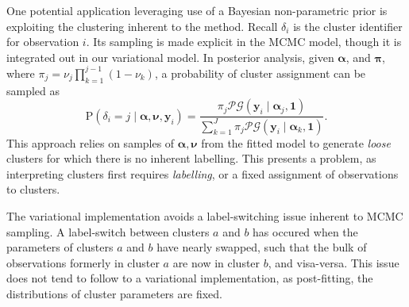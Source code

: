 \begin{comment}
    \begin{itemize}
        \item description of storm parameter clustering problem
        \item Introduction of variational inference
        \begin{itemize}
            \item describe variational distribution
            \item necessity (only model using t90 dataset)
            \item relative performance (computational speed)
        \end{itemize}
        \item describe clustering methodology
        \item Emergent clusters from both t90 and all--but--road--features in input space.
        \item what does this mean?
    \end{itemize}
\end{comment}

One potential application leveraging use of a Bayesian non-parametric prior is 
    exploiting the clustering inherent to the method. Recall $\delta_i$ is the 
    cluster identifier for observation $i$.  Its sampling is made explicit in
    the MCMC model, though it is integrated out in our variational model. In
    posterior analysis, given $\bm{\alpha}$, and $\bm{\pi}$, where 
    $\pi_j = \nu_j\prod_{k = 1}^{j-1}(1 - \nu_k)$, a probability of cluster 
    assignment can be sampled as
    \begin{equation}
        \label{eqn:clusterprob}
        \text{P}\left(\delta_i = j\mid\bm{\alpha},\bm{\nu},\bm{y}_i\right) 
            = \frac{\pi_j\mathcal{PG}(\bm{y}_i\mid\bm{\alpha}_j,\bm{1})}{
            \sum_{k = 1}^J \pi_j\mathcal{PG}(\bm{y}_i\mid\bm{\alpha}_k,\bm{1})}.
    \end{equation}
    This approach relies on samples of $\bm{\alpha},\bm{\nu}$ from the fitted
    model to generate \emph{loose} clusters for which there is no inherent 
    labelling.  This presents a problem, as interpreting clusters first requires
    \emph{labelling}, or a fixed assignment of observations to clusters.

The variational implementation avoids a label-switching issue inherent to 
    MCMC sampling.  A label-switch between clusters $a$ and $b$ has occured when
    the parameters of clusters $a$ and $b$ have nearly swapped, such that the
    bulk of observations formerly in cluster $a$ are now in cluster $b$, and 
    visa-versa.  This issue does not tend to follow to a variational 
    implementation, as post-fitting, the distributions of cluster parameters are 
    fixed.

